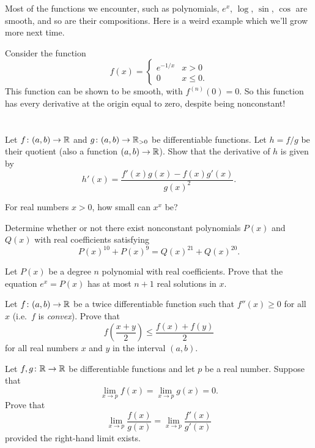 Most of the functions we encounter,
such as polynomials, $e^x$, $\log$, $\sin$, $\cos$
are smooth, and so are their compositions.
Here is a weird example which we'll grow more next time.
\begin{example}
	Consider the function
	\[ f(x) = \begin{cases}
			e^{-1/x} & x > 0 \\
			0 & x \le 0.
		\end{cases}
	\]
	This function can be shown to be smooth,
	with $f^{(n)}(0) = 0$.
	So this function has every derivative at the origin
	equal to zero, despite being nonconstant!
\end{example}

\section{\problemhead}
\begin{problem}
	Let $f \colon (a,b) \to \mathbb R$ and $g \colon (a,b) \to \mathbb R_{>0}$
	be differentiable functions.
	Let $h = f/g$ be their quotient
	(also a function $(a,b) \to \mathbb R$).
	Show that the derivative of $h$ is given by
	\[ h'(x) = \frac{f'(x) g(x) - f(x) g'(x)}{g(x)^2}. \]
\end{problem}

\begin{problem}
	For real numbers $x > 0$, how small can $x^x$ be?
\end{problem}

\begin{problem}
	[RMM 2018]
	\gim
	Determine whether or not there exist
	nonconstant polynomials $P(x)$ and $Q(x)$ with
	real coefficients satisfying
	\[ P(x)^{10} + P(x)^9 = Q(x)^{21} + Q(x)^{20}. \]
\end{problem}

\begin{problem}
	\gim
	Let $P(x)$ be a degree $n$ polynomial with real coefficients.
	Prove that the equation $e^x = P(x)$ has at most $n+1$ real solutions in $x$.
\end{problem}

\begin{problem}
	Let $f \colon (a,b) \to \mathbb R$ be a twice differentiable function
	such that $f''(x) \ge 0$ for all $x$
	(i.e.\ $f$ is \emph{convex}).
	Prove that
	\[ f\left( \frac{x+y}{2} \right)
		\le \frac{f(x) + f(y)}{2} \]
	for all real numbers $x$ and $y$ in the interval $(a,b)$.
\end{problem}

\begin{problem}
	Let $f,g \colon \mathbb R \to \mathbb R$ be differentiable functions
	and let $p$ be a real number.
	Suppose that
	\[ \lim_{x \to p} f(x) = \lim_{x \to p} g(x) = 0. \]
	Prove that
	\[ \lim_{x \to p} \frac{f(x)}{g(x)}
		= \lim_{x \to p} \frac{f'(x)}{g'(x)} \]
	provided the right-hand limit exists.
\end{problem}

